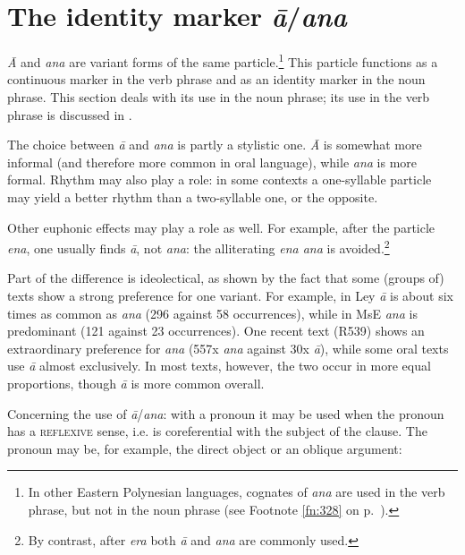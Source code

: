 \section{The identity marker \textit{{\ꞌ}ā}/\textit{{\ꞌ}ana}}\label{sec:5.9}
\textit{{\ꞌ}Ā} and \textit{{\ꞌ}ana} are variant forms of the same particle.\footnote{\label{fn:274}In other Eastern Polynesian languages, cognates of \textit{{\ꞌ}ana} are used in the verb phrase, but not in the noun phrase (see Footnote \ref{fn:328} on p.~\pageref{fn:328}).} This particle functions as a continuous marker in the verb phrase and as an identity marker in the noun phrase. This section deals with its use in the noun phrase; its use in the verb phrase is discussed in .

The choice between \textit{{\ꞌ}ā} and \textit{{\ꞌ}ana} is partly a stylistic one. \textit{{\ꞌ}Ā} is somewhat more informal (and therefore more common in oral language), while \textit{{\ꞌ}ana} is more formal. Rhythm may also play a role: in some contexts a one-syllable particle may yield a better rhythm than a two-syllable one, or the opposite. 

Other euphonic effects may play a role as well. For example, after the particle \textit{ena}, one usually finds \textit{{\ꞌ}ā}, not \textit{{\ꞌ}ana}: the alliterating \textit{ena {\ꞌ}ana} is avoided.\footnote{\label{fn:275}By contrast, after \textit{era} both \textit{{\ꞌ}ā} and \textit{{\ꞌ}ana} are commonly used.}

Part of the difference is ideolectical, as shown by the fact that some (groups of) texts show a strong preference for one variant. For example, in Ley \textit{{\ꞌ}ā} is about six times as common as \textit{{\ꞌ}ana} (296 against 58 occurrences), while in MsE \textit{{\ꞌ}ana} is predominant (121 against 23 occurrences). One recent text (R539) shows an extraordinary preference for \textit{{\ꞌ}ana} (557x \textit{{\ꞌ}ana} against 30x \textit{{\ꞌ}ā}), while some oral texts use \textit{{\ꞌ}ā} almost exclusively. In most texts, however, the two occur in more equal proportions, though \textit{{\ꞌ}ā} is more common overall.

Concerning the use of \textit{{\ꞌ}ā}/\textit{{\ꞌ}ana}: with a pronoun it may be used when the pronoun has a \textsc{reflexive} sense, i.e. is coreferential with the subject of the clause. The pronoun may be, for example, the direct object or an oblique argument:

